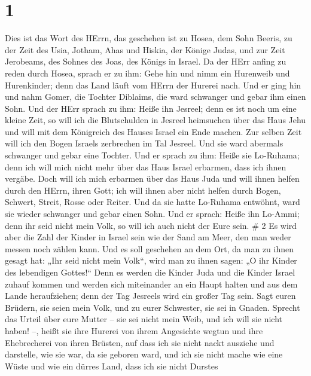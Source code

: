 \hypertarget{section}{%
\section{1}\label{section}}

 Dies ist das Wort des HErrn, das geschehen ist zu Hosea,
dem Sohn Beeris, zu der Zeit des Usia, Jotham, Ahas und Hiskia, der
Könige Judas, und zur Zeit Jerobeams, des Sohnes des Joas, des Königs in
Israel.  Da der HErr anfing zu reden durch Hosea, sprach er
zu ihm: Gehe hin und nimm ein Hurenweib und Hurenkinder; denn das Land
läuft vom HErrn der Hurerei nach.  Und er ging hin und nahm
Gomer, die Tochter Diblaims, die ward schwanger und gebar ihm einen
Sohn.  Und der HErr sprach zu ihm: Heiße ihn Jesreel; denn
es ist noch um eine kleine Zeit, so will ich die Blutschulden in Jesreel
heimsuchen über das Haus Jehu und will mit dem Königreich des Hauses
Israel ein Ende machen.  Zur selben Zeit will ich den Bogen
Israels zerbrechen im Tal Jesreel.  Und sie ward abermals
schwanger und gebar eine Tochter. Und er sprach zu ihm: Heiße sie
Lo-Ruhama; denn ich will mich nicht mehr über das Haus Israel erbarmen,
dass ich ihnen vergäbe.  Doch will ich mich erbarmen über
das Haus Juda und will ihnen helfen durch den HErrn, ihren Gott; ich
will ihnen aber nicht helfen durch Bogen, Schwert, Streit, Rosse oder
Reiter.  Und da sie hatte Lo-Ruhama entwöhnt, ward sie
wieder schwanger und gebar einen Sohn.  Und er sprach: Heiße
ihn Lo-Ammi; denn ihr seid nicht mein Volk, so will ich auch nicht der
Eure sein. \# 2  Es wird aber die Zahl der Kinder in Israel
sein wie der Sand am Meer, den man weder messen noch zählen kann. Und es
soll geschehen an dem Ort, da man zu ihnen gesagt hat: „Ihr seid nicht
mein Volk``, wird man zu ihnen sagen: „O ihr Kinder des lebendigen
Gottes!{}``  Denn es werden die Kinder Juda und die Kinder
Israel zuhauf kommen und werden sich miteinander an ein Haupt halten und
aus dem Lande heraufziehen; denn der Tag Jesreels wird ein großer Tag
sein.  Sagt euren Brüdern, sie seien mein Volk, und zu eurer
Schwester, sie sei in Gnaden.  Sprecht das Urteil über eure
Mutter -- sie sei nicht mein Weib, und ich will sie nicht haben! --,
heißt sie ihre Hurerei von ihrem Angesichte wegtun und ihre Ehebrecherei
von ihren Brüsten,  auf dass ich sie nicht nackt ausziehe
und darstelle, wie sie war, da sie geboren ward, und ich sie nicht mache
wie eine Wüste und wie ein dürres Land, dass ich sie nicht Durstes

